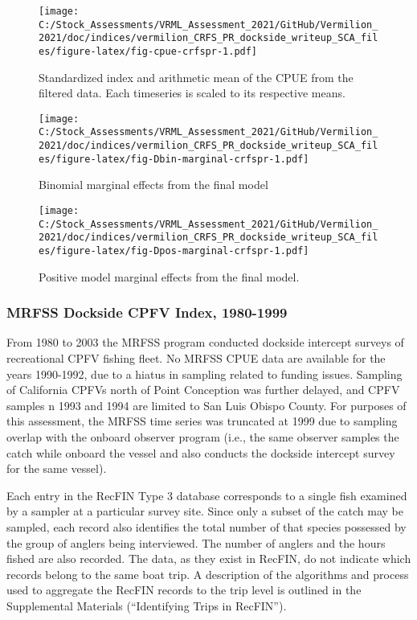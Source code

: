 \documentclass[11pt,
  english,
  a4paper,
]{article}
\begin{document}
\begin{figure}
\centering
\texttt{[image: C:/Stock\_Assessments/VRML\_Assessment\_2021/GitHub/Vermilion\_2021/doc/indices/vermilion\_CRFS\_PR\_dockside\_writeup\_SCA\_files/figure-latex/fig-cpue-crfspr-1.pdf]}
\caption{\label{fig:fig-cpue-crfspr}Standardized index and arithmetic mean of the CPUE from the filtered data. Each timeseries is scaled to its respective means.}
\end{figure}

\begin{figure}
\centering
\texttt{[image: C:/Stock\_Assessments/VRML\_Assessment\_2021/GitHub/Vermilion\_2021/doc/indices/vermilion\_CRFS\_PR\_dockside\_writeup\_SCA\_files/figure-latex/fig-Dbin-marginal-crfspr-1.pdf]}
\caption{\label{fig:fig-Dbin-marginal-crfspr}Binomial marginal effects from the final model}
\end{figure}

\begin{figure}
\centering
\texttt{[image: C:/Stock\_Assessments/VRML\_Assessment\_2021/GitHub/Vermilion\_2021/doc/indices/vermilion\_CRFS\_PR\_dockside\_writeup\_SCA\_files/figure-latex/fig-Dpos-marginal-crfspr-1.pdf]}
\caption{\label{fig:fig-Dpos-marginal-crfspr}Positive model marginal effects from the final model.}
\end{figure}


\hypertarget{mrfss-dockside-cpfv-index-1980-1999}{%
\subsubsection{MRFSS Dockside CPFV Index, 1980-1999}\label{mrfss-dockside-cpfv-index-1980-1999}}

\leavevmode\tagmcend\tagstructend

From 1980 to 2003 the MRFSS program conducted dockside intercept surveys of recreational CPFV fishing fleet. No MRFSS CPUE data are available for the years 1990-1992, due to a hiatus in sampling related to funding issues. Sampling of California CPFVs north of Point Conception was further delayed, and CPFV samples n 1993 and 1994 are limited to San Luis Obispo County. For purposes of this assessment, the MRFSS time series was truncated at 1999 due to sampling overlap with the onboard observer program (i.e., the same observer samples the catch while onboard the vessel and also conducts the dockside intercept survey for the same vessel).

Each entry in the RecFIN Type 3 database corresponds to a single fish examined by a sampler at a particular survey site. Since only a subset of the catch may be sampled, each record also identifies the total number of that species possessed by the group of anglers being interviewed. The number of anglers and the hours fished are also recorded. The data, as they exist in RecFIN, do not indicate which records belong to the same boat trip. A description of the algorithms and process used to aggregate the RecFIN records to the trip level is outlined in the Supplemental Materials (``Identifying Trips in RecFIN'').
\end{document}
